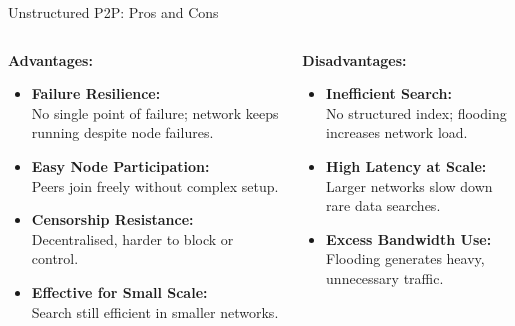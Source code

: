 \documentclass[aspectratio=169, table]{beamer}
\begin{document}
\begin{frame}{Unstructured P2P: Pros and Cons}
	\vspace{20pt}
	\begin{columns}[t]
		
		\begin{column}{0.6\textwidth}
			\textbf{Advantages:}
			\begin{itemize}
				\item \textbf{Failure Resilience:} \\
				No single point of failure; network keeps running despite node failures.
				
				\item \textbf{Easy Node Participation:} \\
				Peers join freely without complex setup.
				
				\item \textbf{Censorship Resistance:} \\
				Decentralised, harder to block or control.
				
				\item \textbf{Effective for Small Scale:} \\
				Search still efficient in smaller networks.
			\end{itemize}
		\end{column}
		
		\begin{column}{0.4\textwidth}
			\textbf{Disadvantages:}
			\begin{itemize}
				\item \textbf{Inefficient Search:} \\
				No structured index; flooding increases network load.
				
				\item \textbf{High Latency at Scale:} \\
				Larger networks slow down rare data searches.
				
				\item \textbf{Excess Bandwidth Use:} \\
				Flooding generates heavy, unnecessary traffic.
			\end{itemize}
		\end{column}
		
	\end{columns}
\end{frame}
\end{document}
